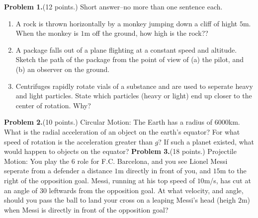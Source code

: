 \documentclass[12pt]{article}
\begin{document}
\bigskip

\bigskip

{\bf Problem 1.}(12 points.) Short answer--no more than one sentence each. 
\begin{enumerate}
\item A rock is thrown horizontally by a monkey jumping down a cliff of hight $5$m. When the monkey is $1$m off the ground, how high is the rock??
\bigskip
\bigskip
\bigskip
\bigskip
\bigskip
\item A package falls out of a plane flighting at a constant speed and altitude. Sketch the path of the package from the point of view of (a) the pilot, and (b) an observer on the ground.
\bigskip
\bigskip
\bigskip
\bigskip
\bigskip
\item Centrifuges rapidly rotate vials of a substance and are used to seperate heavy and light particles. State which particles (heavy or light) end up closer to the center of rotation. Why?
\bigskip
\bigskip
\bigskip
\bigskip
\bigskip
\end{enumerate}
{\bf Problem 2.}(10 points.) Circular Motion:
The Earth has a radius of $6000$km. What is the radial acceleration of an object on the earth's equator? For what speed of rotation is the acceleration greater than $g$? If such a planet existed, what would happen to objects on the equator?
\bigskip
\bigskip
\bigskip
\bigskip
\bigskip
\bigskip
\bigskip
\bigskip
\bigskip
\bigskip
\bigskip
\bigskip
\bigskip
\bigskip
\bigskip
\bigskip
\bigskip
\bigskip
\bigskip
\bigskip
\bigskip
\bigskip
\bigskip
\bigskip
\newpage
{\bf Problem 3.}(18 points.) Projectile Motion:
You play the $6$ role for F.C. Barcelona, and you see Lionel Messi seperate from a defender a distance $1$m directly in front of you, and $15$m to the right of the opposition goal. Messi, running at his top speed of $10$m/s, has cut at an angle of $30$ leftwards from the opposition goal. At what velocity, and angle, should you pass the ball to land your cross on a leaping Messi's head (heigh $2$m) when Messi is directly in front of the opposition goal?
\bigskip
\bigskip
\bigskip
\bigskip
\bigskip
\bigskip
\bigskip
\bigskip
\bigskip
\bigskip
\bigskip
\bigskip
\bigskip
\bigskip
\bigskip
\bigskip
\bigskip
\bigskip
\bigskip
\bigskip
\bigskip
\bigskip
\bigskip
\bigskip
\bigskip
\bigskip
\end{document}
